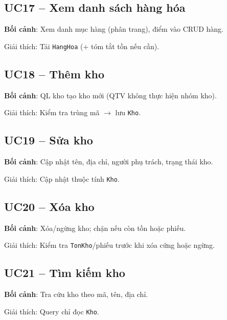 \subsection{UC17 -- Xem danh sách hàng hóa}

\textbf{Bối cảnh}: Xem danh mục hàng (phân trang), điểm vào CRUD hàng.



Giải thích: Tải \texttt{HangHoa} (+ tóm tắt tồn nếu cần).

\subsection{UC18 -- Thêm kho}

\textbf{Bối cảnh}: QL kho tạo kho mới (QTV không thực hiện nhóm kho).



Giải thích: Kiểm tra trùng mã $\rightarrow$ lưu \texttt{Kho}.

\subsection{UC19 -- Sửa kho}

\textbf{Bối cảnh}: Cập nhật tên, địa chỉ, người phụ trách, trạng thái kho.



Giải thích: Cập nhật thuộc tính \texttt{Kho}.

\subsection{UC20 -- Xóa kho}

\textbf{Bối cảnh}: Xóa/ngừng kho; chặn nếu còn tồn hoặc phiếu.



Giải thích: Kiểm tra \texttt{TonKho}/phiếu trước khi xóa cứng hoặc ngừng.

\subsection{UC21 -- Tìm kiếm kho}

\textbf{Bối cảnh}: Tra cứu kho theo mã, tên, địa chỉ.



Giải thích: Query chỉ đọc \texttt{Kho}.

